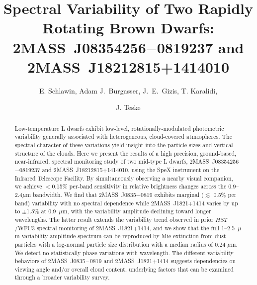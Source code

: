 \documentclass[twocolumn]{aastex6}
\begin{document}
\title{Spectral Variability of Two Rapidly Rotating Brown Dwarfs: \\2MASS~J08354256$-$0819237 and 2MASS~J18212815+1414010}


\author{E. Schlawin, Adam J.\ Burgasser, J.\ E.\  Gizis, T. Karalidi, \and J. Teske}


\begin{abstract}
Low-temperature L dwarfs exhibit low-level, rotationally-modulated photometric variability generally associated with heterogeneous, cloud-covered atmospheres. The spectral character of these variations yield insight into the particle sizes and vertical structure of the clouds. Here we present the results of a high precision, ground-based, near-infrared, spectral monitoring study of two mid-type L dwarfs, 2MASS~J08354256$-$0819237 and 2MASS~J18212815+1414010, using the SpeX instrument on the Infrared Telescope Facility. By simultaneously observing a nearby visual companion, we achieve $<$0.15\% per-band sensitivity in relative brightness changes across the 0.9--2.4$\mu$m bandwidth. We find that 2MASS~J0835$-$0819 exhibits marginal ($\lesssim$ 0.5\% per band) variability with no spectral dependence while 2MASS~J1821+1414 varies by up to $\pm$1.5\% at 0.9~$\mu$m, with the variability amplitude declining toward longer wavelengths. The latter result extends the variability trend observed in prior $HST$/WFC3 spectral monitoring of 2MASS~J1821+1414, and we show that the full 1--2.5~$\mu$m variability amplitude spectrum can be reproduced by Mie extinction from dust particles with a log-normal particle size distribution with a median radius of 0.24 $\mu$m. We detect no statistically phase variations with wavelength. The different variability behaviors of 2MASS~J0835$-$0819 and  2MASS~J1821+1414 suggests dependencies on viewing angle and/or overall cloud content, underlying factors that can be examined through a broader variability survey.
\end{abstract}
\end{document}
